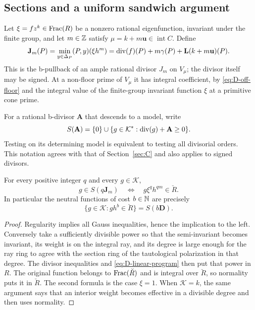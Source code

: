\subsection{Sections and a uniform sandwich argument}

Let $\xi=fz^k\in\operatorname{Frac}(R)$ be a nonzero rational eigenfunction, invariant
under the finite group, and let $m\in\mathbb Z$ satisfy
$\mu=k+m\mathbf u\in\operatorname{int}C$.  Define
\begin{equation}\label{eq:D-section-divisor}
 \mathbf J_m(P)=\min_{y\in\Delta_P}(P,y)(\xi h^m)
   =\operatorname{div}(f)(P)+m\gamma(P)+\mathbf L(k+m\mathbf u)(P).
\end{equation}
This is the b-pullback of an ample rational divisor $J_m$ on $V_\mu$;
the divisor itself may be signed.  At a non-floor prime of $V_\mu$ it has
integral coefficient, by \eqref{eq:D-off-floor} and the integral value of
the finite-group invariant function $\xi$ at a primitive cone prime.

For a rational b-divisor $\mathbf A$ that descends to a model, write
\[
 S(\mathbf A)=\{0\}\cup
 \{g\in\mathcal K^*: \operatorname{div}(g)+\mathbf A\ge0\}.
\]
Testing on its determining model is equivalent to testing all divisorial
orders.  This notation agrees with that of Section~\ref{sec:C} and also
applies to signed divisors.

\begin{lemma}\label{lem:D-section-symbols}
For every positive integer $q$ and every $g\in\mathcal K$,
\begin{equation}\label{eq:D-symbol-equivalence}
 g\in S(q\mathbf J_m)
 \quad\Longleftrightarrow\quad
 g\xi^q h^{qm}\in\breve R.
\end{equation}
In particular the neutral functions of cost $b\in\mathbb N$ are precisely
\begin{equation}\label{eq:D-neutral-functions}
 \{g\in\mathcal K:g h^b\in\breve R\}=S(b\mathbf D).
\end{equation}
\end{lemma}

\begin{proof}
Regularity implies all Gauss inequalities, hence the implication to the
left.  Conversely take a sufficiently divisible power so that the
semi-invariant becomes invariant, its weight is on the integral ray, and
its degree is large enough for the ray ring to agree with the section ring
of the tautological polarization in that degree.  The divisor inequalities
and \eqref{eq:D-linear-program} then put that power in $R$.  The original
function belongs to $\operatorname{Frac}(\breve R)$ and is integral over $\breve R$, so
normality puts it in $\breve R$.  The second formula is the case $\xi=1$.
When $\mathcal K=k$, the same argument says that an interior weight becomes
effective in a divisible degree and then uses normality.
\end{proof}

